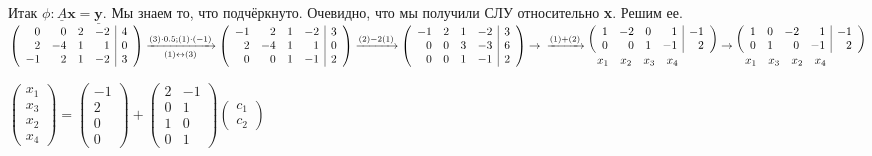 Итак $\phi: \underline{A}\textbf{x}=\underline{\textbf{y}}$. Мы знаем то, что подчёркнуто. Очевидно, что мы получили СЛУ относительно \textbf{x}. Решим ее.
\\
$\left(\begin{array}{rrrr|r}
0 & 0 & 2 & -2 & 4   \\
2 & -4& 1&1&0\\
-1&2&1&-2&3
\end{array}\right)\xrightarrow[(1)\leftrightarrow(3)]{(3)\cdot0.5;(1)\cdot(-1)} \left( \begin{array}{rrrr|r}
-1&2&1&-2&3   \\
2 & -4& 1&1&0\\
0&0&1&-1&2
\end{array}\right) \xrightarrow{(2)-2(1)} \left( \begin{array}{rrrr|r}
-1&2&1&-2&3   \\
0 & 0& 3&-3&6\\
0&0&1&-1&2
\end{array}\right) 
\rightarrow\\
\xrightarrow{(1)+(2)} 
\begin{matrix}
\overset{
	\left(\begin{array}{rrrr|r} %
	1&-2&0&1&-1   \\
	0&0&1&-1&2 \\
	\end{array}\right)
}{
	\begin{matrix*}
	x_1&x_2&x_3&x_4& \ \ \ \ \ 
	\end{matrix*}
}
\end{matrix}
\rightarrow 
\begin{matrix}
\overset{\left(\begin{array}{rrrr|r}
	1&0&-2&1&-1   \\
	0&1&0&-1&2 \\
	\end{array}\right)
}{
	\begin{matrix*}
	x_1&x_3&x_2&x_4& \ \ \ \ \ 
	\end{matrix*}
}
\end{matrix}$
\vspace{3mm}

$\left( \begin{array}{r}
x_1\\
x_3\\
x_2\\
x_4
\end{array}\right) = \left( \begin{array}{r}
-1\\
2\\
0\\
0
\end{array}\right) + \left( \begin{array}{rr}
2 & -1\\
0&1\\
1&0\\
0&1
\end{array}\right) \left( \begin{array}{r}
c_1\\
c_2
\end{array}\right)$
\vspace{3mm}

